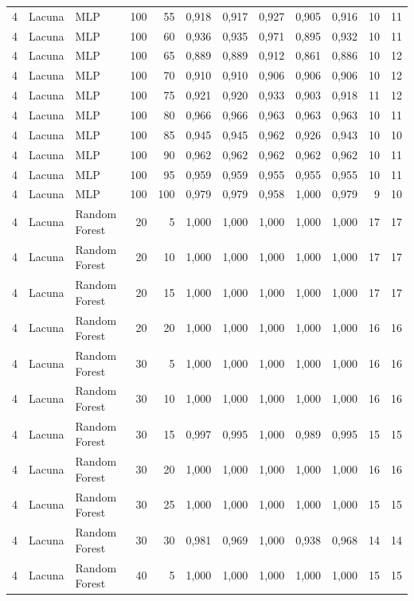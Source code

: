 \begin{longtable}{@{}rllrrrrrrrrr@{}}
4 & Lacuna & MLP & 100 & 55 & 0,918 & 0,917 & 0,927 & 0,905 & 0,916 & 10 & 11 \\
4 & Lacuna & MLP & 100 & 60 & 0,936 & 0,935 & 0,971 & 0,895 & 0,932 & 10 & 11 \\
4 & Lacuna & MLP & 100 & 65 & 0,889 & 0,889 & 0,912 & 0,861 & 0,886 & 10 & 12 \\
4 & Lacuna & MLP & 100 & 70 & 0,910 & 0,910 & 0,906 & 0,906 & 0,906 & 10 & 12 \\
4 & Lacuna & MLP & 100 & 75 & 0,921 & 0,920 & 0,933 & 0,903 & 0,918 & 11 & 12 \\
4 & Lacuna & MLP & 100 & 80 & 0,966 & 0,966 & 0,963 & 0,963 & 0,963 & 10 & 11 \\
4 & Lacuna & MLP & 100 & 85 & 0,945 & 0,945 & 0,962 & 0,926 & 0,943 & 10 & 10 \\
4 & Lacuna & MLP & 100 & 90 & 0,962 & 0,962 & 0,962 & 0,962 & 0,962 & 10 & 11 \\
4 & Lacuna & MLP & 100 & 95 & 0,959 & 0,959 & 0,955 & 0,955 & 0,955 & 10 & 11 \\
4 & Lacuna & MLP & 100 & 100 & 0,979 & 0,979 & 0,958 & 1,000 & 0,979 & 9 & 10 \\
4 & Lacuna & Random Forest & 20 & 5 & 1,000 & 1,000 & 1,000 & 1,000 & 1,000 & 17 & 17 \\
4 & Lacuna & Random Forest & 20 & 10 & 1,000 & 1,000 & 1,000 & 1,000 & 1,000 & 17 & 17 \\
4 & Lacuna & Random Forest & 20 & 15 & 1,000 & 1,000 & 1,000 & 1,000 & 1,000 & 17 & 17 \\
4 & Lacuna & Random Forest & 20 & 20 & 1,000 & 1,000 & 1,000 & 1,000 & 1,000 & 16 & 16 \\
4 & Lacuna & Random Forest & 30 & 5 & 1,000 & 1,000 & 1,000 & 1,000 & 1,000 & 16 & 16 \\
4 & Lacuna & Random Forest & 30 & 10 & 1,000 & 1,000 & 1,000 & 1,000 & 1,000 & 16 & 16 \\
4 & Lacuna & Random Forest & 30 & 15 & 0,997 & 0,995 & 1,000 & 0,989 & 0,995 & 15 & 15 \\
4 & Lacuna & Random Forest & 30 & 20 & 1,000 & 1,000 & 1,000 & 1,000 & 1,000 & 16 & 16 \\
4 & Lacuna & Random Forest & 30 & 25 & 1,000 & 1,000 & 1,000 & 1,000 & 1,000 & 15 & 15 \\
4 & Lacuna & Random Forest & 30 & 30 & 0,981 & 0,969 & 1,000 & 0,938 & 0,968 & 14 & 14 \\
4 & Lacuna & Random Forest & 40 & 5 & 1,000 & 1,000 & 1,000 & 1,000 & 1,000 & 15 & 15 \\

\end{longtable}
